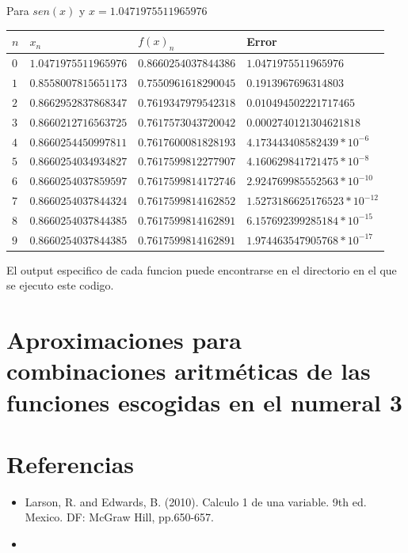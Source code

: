 \documentclass[12pt]{article}
\begin{document}
    Para $sen(x)$ y $x = 1.0471975511965976$
        \begin{center}
            \begin{tabular}{|l|l|l|l|} \hline
            $n$ & $x_{n}$ & $f(x)_{n}$ & Error \\
            \hline \hline
            $0$ & $1.0471975511965976$ & $0.8660254037844386$ & $1.0471975511965976$    \\
            \hline 
            $1$ & $0.8558007815651173$ & $0.7550961618290045$ & $0.1913967696314803$\\
            \hline 
            $2$ & $0.8662952837868347$ & $0.7619347979542318$ & $0.010494502221717465$\\
            \hline 
            $3$ & $0.8660212716563725$ & $0.7617573043720042$ & $0.0002740121304621818$\\
            \hline 
            $4$ & $0.8660254450997811$ & $0.7617600081828193$ & $4.173443408582439 * 10^{-6}$\\
            \hline 
            $5$ & $0.8660254034934827$ & $0.7617599812277907$ & $4.160629841721475 * 10^{-8}$\\
            \hline 
            $6$ & $0.8660254037859597$ & $0.7617599814172746$ & $2.924769985552563 * 10^{-10}$\\
            \hline 
            $7$ & $0.8660254037844324$ & $0.7617599814162852$ & $1.5273186625176523 * 10^{-12}$\\
            \hline 
            $8$ & $0.8660254037844385$ & $0.7617599814162891$ & $6.157692399285184* 10^{-15}$\\
            \hline 
            $9$ & $0.8660254037844385$ & $0.7617599814162891$ & $1.974463547905768* 10^{-17}$\\
            \hline
            \end{tabular}
        \end{center}

    El output especifico de cada funcion puede encontrarse en el directorio en el que se ejecuto este codigo.


        \section {Aproximaciones para combinaciones aritméticas de las funciones escogidas en el numeral 3}

        \section {Referencias}

        \begin{itemize}
        \item{Larson, R. and Edwards, B. (2010). Calculo 1 de una variable. 9th ed. Mexico. DF: McGraw Hill, pp.650-657.}
        \item{}
        \end{itemize}
\end{document}
